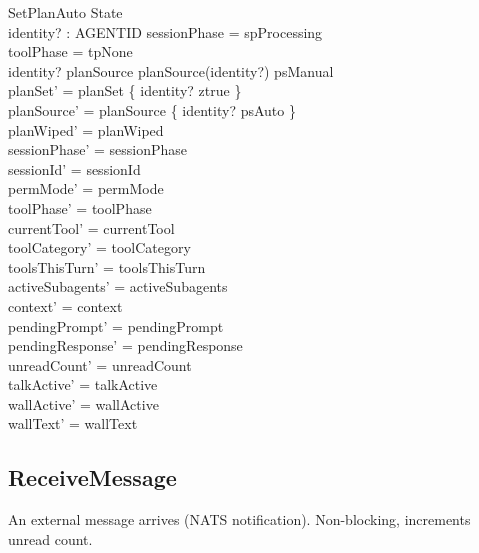 \documentclass[a4paper,10pt,fleqn]{article}
\begin{document}
\begin{schema}{SetPlanAuto}
  \Delta State \\
  identity? : AGENTID
  \where
  sessionPhase = spProcessing \\
  toolPhase = tpNone \\
  identity? \notin \dom planSource \lor planSource(identity?) \neq psManual \\
  planSet' = planSet \oplus \{ identity? \mapsto ztrue \} \\
  planSource' = planSource \oplus \{ identity? \mapsto psAuto \} \\
  planWiped' = planWiped \\
  sessionPhase' = sessionPhase \\
  sessionId' = sessionId \\
  permMode' = permMode \\
  toolPhase' = toolPhase \\
  currentTool' = currentTool \\
  toolCategory' = toolCategory \\
  toolsThisTurn' = toolsThisTurn \\
  activeSubagents' = activeSubagents \\
  context' = context \\
  pendingPrompt' = pendingPrompt \\
  pendingResponse' = pendingResponse \\
  unreadCount' = unreadCount \\
  talkActive' = talkActive \\
  wallActive' = wallActive \\
  wallText' = wallText
\end{schema}

\subsection{ReceiveMessage}

An external message arrives (NATS notification). Non-blocking,
increments unread count.
\end{document}
